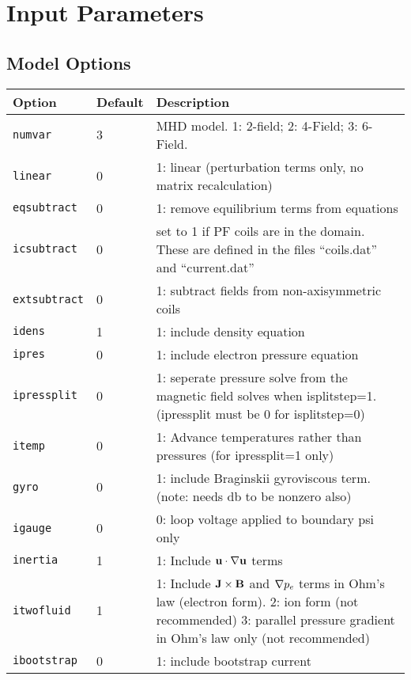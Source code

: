 \section{Input Parameters}
\label{sec:input_parameters}
\subsection{Model Options}

\begin{tabular}{llp{3in}}
  \textbf{Option}&\textbf{Default}&\textbf{Description}\\
  \hline
  \texttt{numvar} & 3   & MHD model. 1: 2-field;  2: 4-Field;  3: 6-Field.\\
  \texttt{linear} & 0   & 1: linear (perturbation terms only, no matrix
  recalculation)\\
  \texttt{eqsubtract}& 0& 1: remove equilibrium terms from equations\\
  \texttt{icsubtract}& 0& set to 1 if PF coils are in the domain.  These are
  defined in the files ``coils.dat'' and ``current.dat''\\
  \texttt{extsubtract} & 0 & 1: subtract fields from non-axisymmetric coils \\
  \texttt{idens}  & 1   & 1: include density equation\\
  \texttt{ipres}  & 0   & 1: include electron pressure equation\\
  \texttt{ipressplit} & 0 & 1: seperate pressure solve from the magnetic field
  solves when isplitstep=1.  (ipressplit must be 0 for isplitstep=0) \\
  \texttt{itemp} & 0 & 1: Advance temperatures rather than pressures (for ipressplit=1 only) \\
  \texttt{gyro}   & 0   & 1: include Braginskii gyroviscous term.  (note:
  needs db to be nonzero also) \\
  \texttt{igauge} & 0   & 0: loop voltage applied to boundary psi only \\
  \texttt{inertia} & 1  & 1: Include $\mathbf{u} \cdot \nabla \mathbf{u}$ terms\\
  \texttt{itwofluid}& 1 & 1: Include $\mathbf{J}\times\mathbf{B}$ and
  $\nabla p_e$ terms in Ohm's law (electron form).  2: ion form (not
  recommended)  3: parallel pressure gradient in Ohm's law only
  (not recommended) \\
  \texttt{ibootstrap} & 0 & 1: include bootstrap current \\

\end{tabular}
